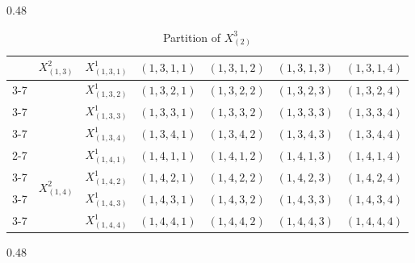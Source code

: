 \documentclass[12pt]{article}
\begin{document}
\begin{table}[p]
\begin{subtable}[t]{0.48\textwidth}
{\begin{tabular}{|c|c|c|c|c|c|c|}
                                  & \multirow{4}{*}{$X_{(1,3)}^{2}$} & $X_{(1,3,1)}^{1}$ & \cellcolor{green!40}$(1,3,1,1)$ & \cellcolor{yellow!40} $(1,3,1,2)$ & \cellcolor{red!40} $(1,3,1,3)$ & \cellcolor{blue!40}$(1,3,1,4)$ \\ \cline{3-7}
                                  &                                  & $X_{(1,3,2)}^{1}$ & \cellcolor{yellow!40} $(1,3,2,1)$ & \cellcolor{red!40}$(1,3,2,2)$ &\cellcolor{blue!40} $(1,3,2,3)$ & \cellcolor{green!40}$(1,3,2,4)$ \\ \cline{3-7}
                                  &                                  & $X_{(1,3,3)}^{1}$ & \cellcolor{red!40}$(1,3,3,1)$ & \cellcolor{blue!40}$(1,3,3,2)$ & \cellcolor{green!40}$(1,3,3,3)$ &\cellcolor{yellow!40} $(1,3,3,4)$ \\ \cline{3-7}
                                  &                                  & $X_{(1,3,4)}^{1}$ & \cellcolor{blue!40}$(1,3,4,1)$ & \cellcolor{green!40} $(1,3,4,2)$ & \cellcolor{yellow!40} $(1,3,4,3)$ & \cellcolor{red!40}$(1,3,4,4)$ \\ \cline{2-7}
                                  & \multirow{4}{*}{$X_{(1,4)}^{2}$} & $X_{(1,4,1)}^{1}$ & \cellcolor{yellow!40}$(1,4,1,1)$ &\cellcolor{red!40} $(1,4,1,2)$ &\cellcolor{blue!40} $(1,4,1,3)$ &\cellcolor{green!40} $(1,4,1,4)$ \\ \cline{3-7}
                                  &                                  & $X_{(1,4,2)}^{1}$ & \cellcolor{red!40}$(1,4,2,1)$ &\cellcolor{blue!40} $(1,4,2,2)$ &\cellcolor{green!40} $(1,4,2,3)$ &\cellcolor{yellow!40} $(1,4,2,4)$ \\ \cline{3-7}
                                  &                                  & $X_{(1,4,3)}^{1}$ & \cellcolor{blue!40} $(1,4,3,1)$ & \cellcolor{green!40} $(1,4,3,2)$ & \cellcolor{yellow!40} $(1,4,3,3)$ & \cellcolor{red!40}$(1,4,3,4)$ \\ \cline{3-7}
                                  &                                  & $X_{(1,4,4)}^{1}$ & \cellcolor{green!40}$(1,4,4,1)$ &\cellcolor{yellow!40} $(1,4,4,2)$ &\cellcolor{red!40} $(1,4,4,3)$ &\cellcolor{blue!40} $(1,4,4,4)$ \\ \hline
  \end{tabular}%
  }%
\end{subtable}%
\hfill
\begin{subtable}[t]{0.48\textwidth}
  \centering
  \caption{Partition of $X_{(2)}^{3}$}
  \renewcommand{\arraystretch}{1.5}
\end{subtable}
\end{table}
\end{document}

